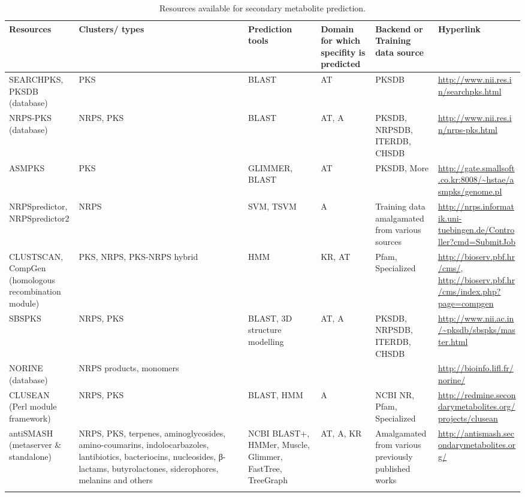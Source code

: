 		\begin{singlespace}
		\begin{small}
		\begin{longtabu}[tbp]{p{2.5cm} p{2cm} p{2cm} p{2cm} p{2cm} p{2.5cm}}
		\caption{Resources available for secondary metabolite prediction.}
		\\ \hline\hline\hline
		 \bf{Resources} & \bf{Clusters/ types} & \bf{Prediction tools} & \bf{Domain for which specifity is predicted} & \bf{Backend or Training data source} & \bf{Hyperlink} \\ \hline\hline\hline
		SEARCHPKS, PKSDB (database) & PKS & BLAST & AT & PKSDB & \url{http://www.nii.res.in/searchpks.html} \\ \hline
		NRPS-PKS (database) & NRPS, PKS & BLAST & AT, A	& PKSDB, NRPSDB, ITERDB, CHSDB & \url{http://www.nii.res.in/nrps-pks.html} \\ \hline
		ASMPKS & PKS & GLIMMER, BLAST & AT & PKSDB, More & \url{http://gate.smallsoft.co.kr:8008/~hstae/asmpks/genome.pl} \\ \hline 
		NRPSpredictor, NRPSpredictor2 & NRPS & SVM, TSVM & A & Training data amalgamated from various sources &	\url{http://nrps.informatik.uni-tuebingen.de/Controller?cmd=SubmitJob} \\ \hline 
		CLUSTSCAN, CompGen (homologous recombination module) & PKS, NRPS, PKS-NRPS hybrid & HMM	& KR, AT & Pfam, Specialized & \url{http://bioserv.pbf.hr/cms/}, \url{http://bioserv.pbf.hr/cms/index.php?page=compgen} \\ \hline
		SBSPKS & NRPS, PKS & BLAST, 3D structure modelling & AT, A & PKSDB, NRPSDB, ITERDB, CHSDB & \url{http://www.nii.ac.in/~pksdb/sbspks/master.html} \\ \hline
		NORINE (database) & NRPS products, monomers & & & & \url{http://bioinfo.lifl.fr/norine/} \\ \hline
		CLUSEAN (Perl module framework)	& NRPS, PKS & BLAST, HMM & A & NCBI NR, Pfam, Specialized & \url{http://redmine.secondarymetabolites.org/projects/clusean} \\ \hline
		antiSMASH (metaserver \& standalone) & NRPS, PKS, terpenes, aminoglycosides, amino-coumarins, indolocarbazoles, lantibiotics, bacteriocins, nucleosides, β-lactams, butyrolactones, siderophores, melanins and others & NCBI BLAST+, HMMer, Muscle, Glimmer, FastTree, TreeGraph & AT, A, KR & Amalgamated from various previously published works	& \url{http://antismash.secondarymetabolites.org/} \\ \hline\hline\hline
		\label{tab:pks_res}
		\end{longtabu}
		\end{small}
		\end{singlespace}


